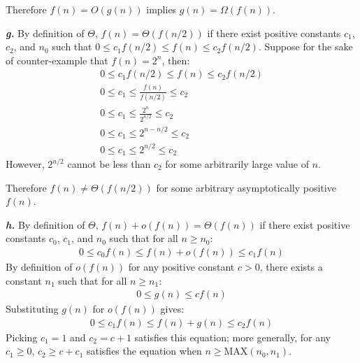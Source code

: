 Therefore $f(n) = O(g(n))$ implies $g(n) = \Omega(f(n))$.

\noindent\textbf{\textit{g.}} By definition of $\Theta$, $f(n) = \Theta(f(n/2))$ if there exist positive constants $c_1$, $c_2$, and $n_0$ such that $0 \leq c_1 f(n/2) \leq f(n) \leq c_2 f(n/2)$. Suppose for the sake of counter-example that $f(n) = 2^n$, then:
\begin{eqnarray*}
	0 \leq c_1 f(n/2) \leq f(n) \leq c_2 f(n/2) \\
	0 \leq c_1 \leq \frac{f(n)}{f(n/2)} \leq c_2 \\
	0 \leq c_1 \leq \frac{2^n}{2^{n/2}} \leq c_2 \\
	0 \leq c_1 \leq 2^{n - n/2} \leq c_2 \\
	0 \leq c_1 \leq 2^{n/2} \leq c_2
\end{eqnarray*}
However, $2^{n/2}$ cannot be less than $c_2$ for some arbitrarily large value of $n$.

Therefore $f(n) \neq \Theta(f(n/2))$ for some arbitrary asymptotically positive $f(n)$.

\noindent\textbf{\textit{h.}} By definition of $\Theta$, $f(n) + o(f(n)) = \Theta(f(n))$ if there exist positive constants $c_0$, $c_1$, and $n_0$ such that for all $n \geq n_0$:
\begin{eqnarray*}
	0 \leq c_0 f(n) \leq f(n) + o(f(n)) \leq c_1 f(n)
\end{eqnarray*}
By definition of $o(f(n))$ for any positive constant $c > 0$, there exists a constant $n_1$ such that for all $n \geq n_1$:
\begin{eqnarray*}
	0 \leq g(n) \leq cf(n)
\end{eqnarray*}
Substituting $g(n)$ for $o(f(n))$ gives:
\begin{eqnarray*}
	0 \leq c_1 f(n) \leq f(n) + g(n) \leq c_2 f(n)
\end{eqnarray*}
Picking $c_1 = 1$ and $c_2 = c + 1$ satisfies this equation; more generally, for any $c_1 \geq 0$, $c_2 \geq c + c_1$ satisfies the equation when $n \geq \text{MAX}(n_0, n_1)$.

